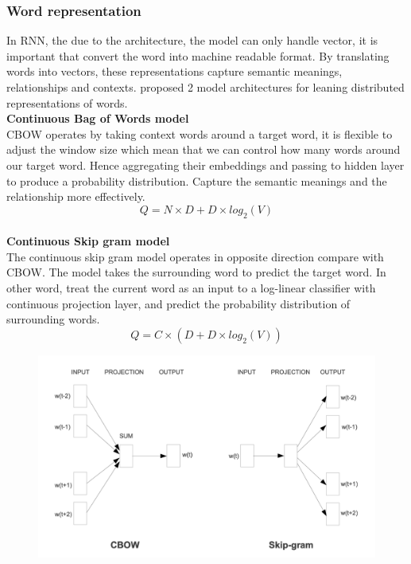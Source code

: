 \documentclass[12pt,a4paper]{article}
\begin{document}
\subsubsection{Word representation}
In RNN, the due to the architecture, the model can only handle vector, it is important that convert the word into machine readable format. By translating words into vectors, these representations capture semantic meanings, relationships and contexts. \parencite{mikolov2013efficient} proposed 2 model architectures for leaning distributed representations of words.
\\[1ex]
\textbf{Continuous Bag of Words model}
\\[1ex]
CBOW operates by taking context words around a target word, it is flexible to adjust the window size which mean that we can control how many words around our target word. Hence aggregating their embeddings and passing to hidden layer to produce a probability distribution. Capture the semantic meanings and the relationship more effectively. 
\begin{equation}
    Q = N \times D + D \times log_2(V)
\end{equation}
\\[1ex]
\textbf{Continuous Skip gram model}
\\[1ex]
The continuous skip gram model operates in opposite direction compare with CBOW. The model takes the surrounding word to predict the target word. In other word, treat the current word as an input to a log-linear classifier with continuous projection layer, and predict the probability distribution of surrounding words.
\begin{equation}
    Q = C \times (D + D \times log_2(V))
\end{equation}
\begin{figure}[!htb]
    \centering
    \includegraphics[width=1\textwidth]{../Pic/word_representation.png} %
\end{figure}
\end{document}
